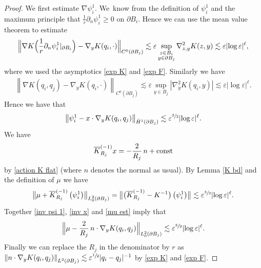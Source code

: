 \documentclass[JEP,XML,SOM,Unicode,published]{cedram}
\let\epsilon\varepsilon
\newcommand{\const}{\textup{const}}
\theoremstyle{definition}
\newcommand\norm[1]{\left\lVert #1\right\rVert}
\newcommand\bnorm[1]{\bigl\lVert #1\bigr\rVert}
\newcommand\Bnorm[1]{\Bigl\lVert #1\Bigr\rVert}
\newcommand\eq{=}
\let\de\partial
\let\eps\epsilon
\begin{document}
\begin{proof}
We first estimate $\nabla\psi_i^1$. We~know from the definition of $\psi_i^1$ and the maximum principle that $\frac{1}{r}\de_n\psi_i^1\geq 0$ on $\de B_i$. Hence we can use the mean value theorem to estimate\vspace*{-3pt}
\begin{equation}\label{est psi 1}
\Bnorm{\nabla K\Bigl(\frac{1}{r}\de_n\psi_i^1|_{\de B_i}\Bigr)-\nabla_y K(q_i,\cdot)}_{C^0(\de B_j)}\lesssim \eps \sup_{\substack{z\in B_i\\y\in \de B_j}}\nabla_{z,y}^2 K(z,y)\lesssim \eps|{\log\eps}|^\ell,
\end{equation}
where we used the asymptotics \eqref{exp K} and \eqref{exp F}. Similarly we have\vspace*{-3pt}
\begin{align*}
\norm{\nabla K(q_i,q_j)-\nabla_yK\left(q_i,\cdot\right)}_{C^0(\de B_j)}\lesssim \eps \sup_{y\in B_j}|\nabla_{y}^2K(q_i,y)|\lesssim \eps|{\log\eps}|^\ell.
\end{align*}
Hence we have that
\begin{align}\label{inv psi 1}
\norm{\psi_i^1-x\cdot\nabla_y K(q_i,q_j)}_{\dot{H}^1(\de B_j)}\lesssim \eps^{\sfrac{3}{2}}|{\log\eps}|^\ell.
\end{align}
We have
\begin{align}\label{inv x}
\overline{K}_{R_j}^{(-1)}x\eq-\frac{2}{R_j}\,n+\const
\end{align} by \eqref{action K flat} (where $n$ denotes the normal as usual).
By Lemma \ref{K bd} and the definition of $\mu$ we have\vspace*{-3pt}
\begin{align}\label{mu est}
\bnorm{\mu+\overline{K}_{R_j}^{(-1)}\left(\psi_i^1\right)}_{L_0^2(\de B_j)}\eq \bnorm{\bigl(\overline{K}_{R_j}^{(-1)}-K^{-1}\bigr)\left(\psi_i^1\right)}\lesssim \eps^{\sfrac{3}{2}}|{\log\eps}|^\ell.
\end{align}
Together \eqref{inv psi 1}, \eqref{inv x} and \eqref{mu est} imply that\vspace*{-3pt}
\begin{align*}
\Bnorm{\mu-\frac{2}{R_j}\,n\cdot\nabla_y K(q_i,q_j)}_{L_0^2(\de B_j)}\lesssim \eps^{\sfrac{3}{2}}|{\log\eps}|^\ell.
\end{align*}
Finally we can replace the $R_j$ in the denominator by $r$ as $\norm{n\cdot \nabla_y K(q_i,q_j)}_{L^2(\de B_j)}\lesssim \eps^{\sfrac{1}{2}}|q_i-q_j|^{-1}$ by \eqref{exp K} and \eqref{exp F}.
\end{proof}
\end{document}
